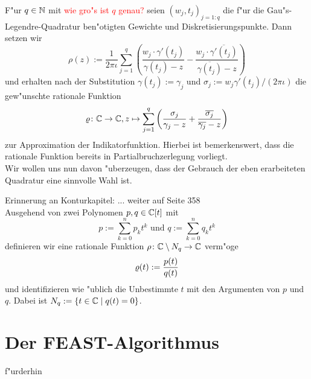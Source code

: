 F"ur $q\in\mathbb{N}$ mit \textcolor{red}{wie gro"s ist $q$ genau?} seien $(w_j, t_j)_{j=1:q}$
die f"ur die Gau"s-Legendre-Quadratur ben"otigten Gewichte und Diskretisierungspunkte.
Dann setzen wir
\[
\rho(z) := \frac{1}{2\pi\iota}\sum_{j=1}^q \left(
\frac{w_j \cdot \gamma'(t_j)}{\gamma(t_j)-z} - \frac{w_j \cdot \overline{\gamma'(t_j)}}{\overline{\gamma(t_j)}-z}
\right)
\]
und erhalten nach der Substitution $\gamma(t_j) := \gamma_j$ und
$\sigma_j := w_j \gamma'(t_j) / (2\pi\iota)$ die gew"unschte rationale
Funktion
\[
\varrho\colon\mathbb{C}\to\mathbb{C}, z\mapsto\sum_{j=1}^q\left(\frac{\sigma_j}{\gamma_j - z} +
\frac{\overline{\sigma_j}}{\overline{\gamma_j} - z}\right)
\]
zur Approximation der Indikatorfunktion. Hierbei ist bemerkenswert, dass die
rationale Funktion bereits in Partialbruchzerlegung vorliegt.\\

Wir wollen uns nun davon "uberzeugen, dass der Gebrauch der eben erarbeiteten
Quadratur eine sinnvolle Wahl ist.

Erinnerung an Konturkapitel: ... weiter auf Seite 358\\

Ausgehend von zwei Polynomen $p, q\in\mathbb{C} [t]$ mit
\[
p := \sum_{k=0}^n p_k t^k \text{ \ und\ } q := \sum_{k=0}^n q_k t^k
\]
definieren wir eine rationale Funktion $\rho\colon\mathbb{C}\setminus{N_q}\to\mathbb{C}$ verm"oge
\[
\varrho(t) := \frac{p(t)}{q(t)}
\]
und identifizieren wie "ublich die Unbestimmte $t$ mit den Argumenten von $p$ und $q$.
Dabei ist $N_q := \{t\in\mathbb{C} \mid q(t) = 0\}$.
\section{Der FEAST-Algorithmus}

f"urderhin

